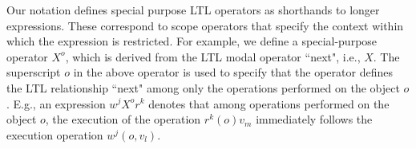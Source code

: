 \documentclass{sig-alternate-05-2015}
\begin{document}

Our notation defines special purpose LTL operators as shorthands to longer expressions. These correspond to scope operators
   that specify the context within which the expression is
  restricted. For example, we define a special-purpose operator  $X^{o}$, which is derived
  from the  LTL modal operator ``next", i.e., $X$. The superscript ${o}$ in the above operator is used to specify that the
   operator defines the LTL relationship ``next" among only the operations performed on the object ${o}$. 
     E.g., an expression ${w^j} X^{o} {r^k}$ denotes that among operations performed on the object
     ${o}$, the execution of the operation $r^k(o){v_m}$ immediately follows the execution operation $w^j(o,v_l)$.
\end{document}
